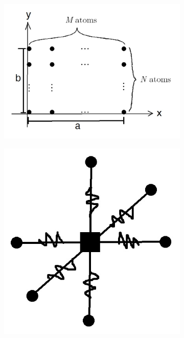 \documentclass[letterpaper,12pt]{article}
\begin{document}
\begin{flushleft}
\begin{figure}[h]
        \begin{subfigure}[b]{0.6\textwidth}
            \includegraphics[width=\textwidth]{images/I2.jpg}
            \caption{}
            \label{fig:I2}
        \end{subfigure}
        \quad
        \begin{subfigure}[b]{0.3\textwidth}
            \includegraphics[width=\textwidth]{images/I3.jpg}

\end{subfigure}
\end{figure}
\end{flushleft}
\end{document}
